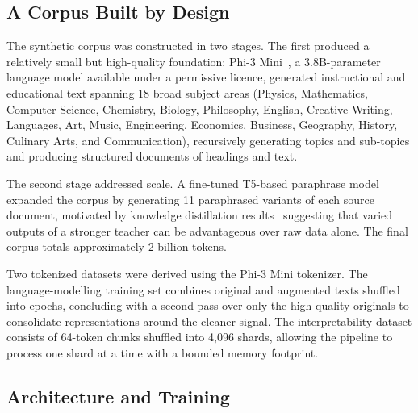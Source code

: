 \documentclass[10pt]{article}
\begin{document}
\subsection{A Corpus Built by Design}

The synthetic corpus was constructed in two stages.
The first produced a relatively small but high-quality foundation: Phi-3 Mini~\citep{abdin2024phi3}, a 3.8B-parameter language model available under a permissive licence, generated instructional and educational text spanning 18 broad subject areas (Physics, Mathematics, Computer Science, Chemistry, Biology, Philosophy, English, Creative Writing, Languages, Art, Music, Engineering, Economics, Business, Geography, History, Culinary Arts, and Communication), recursively generating topics and sub-topics and producing structured documents of headings and text.

The second stage addressed scale.
A fine-tuned T5-based paraphrase model~\citep{vorobev2023paraphraser, raffel2020exploring} expanded the corpus by generating 11 paraphrased variants of each source document, motivated by knowledge distillation results~\citep{ba2014deep, hinton2015distilling} suggesting that varied outputs of a stronger teacher can be advantageous over raw data alone.
The final corpus totals approximately 2 billion tokens.

Two tokenized datasets were derived using the Phi-3 Mini tokenizer.
The language-modelling training set combines original and augmented texts shuffled into epochs, concluding with a second pass over only the high-quality originals to consolidate representations around the cleaner signal.
The interpretability dataset consists of 64-token chunks shuffled into 4,096 shards, allowing the pipeline to process one shard at a time with a bounded memory footprint.

\subsection{Architecture and Training}
\end{document}
